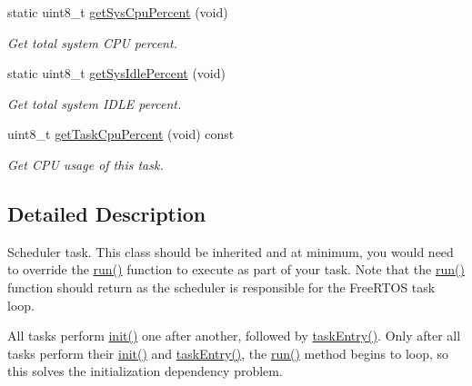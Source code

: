\begin{DoxyCompactItemize}
\item 
static uint8\+\_\+t \hyperlink{classscheduler__task_a38fa70a4cef62c62ee1d83ff7c5bb2cf}{get\+Sys\+Cpu\+Percent} (void)
\begin{DoxyCompactList}\small\item\em Get total system C\+PU percent. \end{DoxyCompactList}\item 
static uint8\+\_\+t \hyperlink{classscheduler__task_a63583f9268259c6300db86c392befddd}{get\+Sys\+Idle\+Percent} (void)
\begin{DoxyCompactList}\small\item\em Get total system I\+D\+LE percent. \end{DoxyCompactList}\item 
uint8\+\_\+t \hyperlink{classscheduler__task_a6c077dab86586e0f74686c0843804c80}{get\+Task\+Cpu\+Percent} (void) const 
\begin{DoxyCompactList}\small\item\em Get C\+PU usage of this task. \end{DoxyCompactList}\end{DoxyCompactItemize}


\subsection{Detailed Description}
Scheduler task. This class should be inherited and at minimum, you would need to override the \hyperlink{classscheduler__task_a17e9027d2a79dded027a8d0737ab0e77}{run()} function to execute as part of your task. Note that the \hyperlink{classscheduler__task_a17e9027d2a79dded027a8d0737ab0e77}{run()} function should return as the scheduler is responsible for the Free\+R\+T\+OS task loop.

All tasks perform \hyperlink{classscheduler__task_ab72fdc17bcb76996bfd41387d604f982}{init()} one after another, followed by \hyperlink{classscheduler__task_a2a0499b206a36efd9542b00eac8f2a14}{task\+Entry()}. Only after all tasks perform their \hyperlink{classscheduler__task_ab72fdc17bcb76996bfd41387d604f982}{init()} and \hyperlink{classscheduler__task_a2a0499b206a36efd9542b00eac8f2a14}{task\+Entry()}, the \hyperlink{classscheduler__task_a17e9027d2a79dded027a8d0737ab0e77}{run()} method begins to loop, so this solves the initialization dependency problem.

